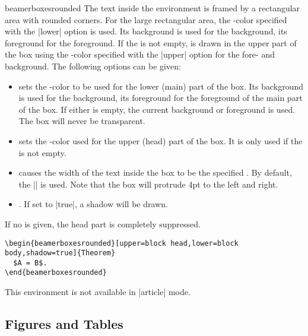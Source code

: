 \begin{environment}{{beamerboxesrounded}}
  The text inside the environment is framed by a rectangular area with
  rounded corners. For the large rectangular area, the \beamer-color
  specified with the |lower| option  is used. Its background is used
  for the background, its foreground for the foreground. If the
   is not empty,  is drawn in the
  upper part of the box using the \beamer-color specified with the
  |upper| option for the fore- and background. The following options
  can be given:
  \begin{itemize}
  \item {} sets the \beamer-color
    to be used for the lower (main) part of the box. Its background is
    used for the background, its foreground for the foreground of the
    main part of the box. If either is empty, the current background
    or foreground is used. The box will never be transparent.
  \item {} sets the \beamer-color
    used for the upper (head) part of the box. It is only used if the
     is not empty.
  \item {} causes the width of the
    text inside the box to be the specified . By
    default, the |\textwidth| is used. Note that the box will protrude
    4pt to the left and right.
  \item {}. If set to |true|, a
    shadow will be drawn.
  \end{itemize}
  If no  is given, the head part is completely suppressed.
  \example
\begin{verbatim}
\begin{beamerboxesrounded}[upper=block head,lower=block body,shadow=true]{Theorem}
  $A = B$.
\end{beamerboxesrounded}
\end{verbatim}

  \articlenote
  This environment is not available in |article| mode.
\end{environment}





\subsection{Figures and Tables}

